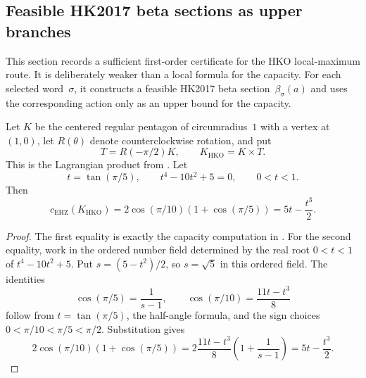 %
%

\subsection{Feasible HK2017 beta sections as upper branches}
\label{sec:hko-feasible-section-upper-branches}

This section records a sufficient first-order certificate for the HKO
local-maximum route.  It is deliberately weaker than a local formula for the
capacity.  For each selected word~$\sigma$, it constructs a feasible
HK2017 beta section~$\beta_\sigma(a)$ and uses the corresponding action only
as an upper bound for the capacity.

\begin{lemma}
\label{lem:hko-capacity-normalization}
Let $K$ be the centered regular pentagon of circumradius~$1$ with a vertex at
$(1,0)$, let $R(\theta)$ denote counterclockwise rotation, and put
\[
  T=R(-\pi/2)K,
  \qquad
  K_{\mathrm{HKO}}=K\times T.
\]
This is the Lagrangian product from
\cite[Proposition~1.4]{HaimKislevOstrover2024}.
Let
\[
  t=\tan(\pi/5),
  \qquad
  t^4-10t^2+5=0,
  \qquad
  0<t<1 .
\]
Then
\[
  c_{\mathrm{EHZ}}(K_{\mathrm{HKO}})
  =
  2\cos(\pi/10)(1+\cos(\pi/5))
  =
  5t-\frac{t^3}{2}.
\]
\end{lemma}

\begin{proof}
The first equality is exactly the capacity computation in
\cite[Proposition~1.4]{HaimKislevOstrover2024}.  For the second equality,
work in the ordered number field determined by the real root
$0<t<1$ of $t^4-10t^2+5$.  Put $s=(5-t^2)/2$, so $s=\sqrt{5}$ in this
ordered field.  The identities
\[
  \cos(\pi/5)=\frac{1}{s-1},
  \qquad
  \cos(\pi/10)=\frac{11t-t^3}{8}
\]
follow from $t=\tan(\pi/5)$, the half-angle formula, and the sign choices
$0<\pi/10<\pi/5<\pi/2$.  Substitution gives
\[
  2\cos(\pi/10)(1+\cos(\pi/5))
  =
  2\frac{11t-t^3}{8}\left(1+\frac{1}{s-1}\right)
  =
  5t-\frac{t^3}{2}.
\]
\end{proof}


